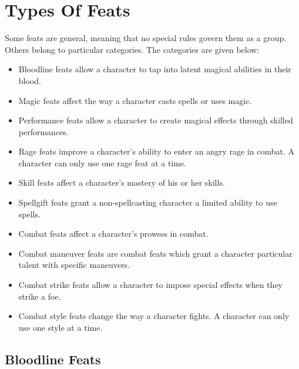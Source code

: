 \section{Types Of Feats}
    Some feats are general, meaning that no special rules govern them as a group.
    Others belong to particular categories.
    The categories are given below:
    \begin{itemize}
        \item Bloodline feats allow a character to tap into latent magical abilities in their blood.
        \item Magic feats affect the way a character casts spells or uses magic.
        \item Performance feats allow a character to create magical effects through skilled performances.
        \item Rage feats improve a character's ability to enter an angry rage in combat.
            A character can only use one rage feat at a time.
        \item Skill feats affect a character's mastery of his or her skills.
        \item Spellgift feats grant a non-spellcasting character a limited ability to use spells.
        \item Combat feats affect a character's prowess in combat.
        \item Combat maneuver feats are combat feats which grant a character particular talent with specific maneuvers.
        \item Combat strike feats allow a character to impose special effects when they strike a foe.
        \item Combat style feats change the way a character fights.
            A character can only use one style at a time.
    \end{itemize}

    \subsection{Bloodline Feats}


